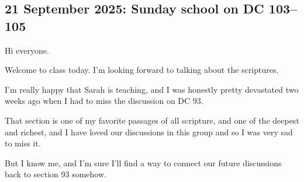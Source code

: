 	\subsection{21 September 2025: Sunday school on DC 103--105}
		\label{TALKS-21-09-2025}
		
		\begin{compactitem}
		
			\item Hi everyone.
				\begin{compactitem}
					\item Welcome to class today. I'm looking forward to talking about the scriptures.
					\item I'm really happy that Sarah is teaching, and I was honestly pretty devastated two weeks ago when I had to miss the discussion on DC 93.
					\item That section is one of my favorite passages of all scripture, and one of the deepest and richest, and I have loved our discussions in this group and so I was very sad to miss it.
					\item But I know me, and I'm sure I'll find a way to connect our future discussions back to section 93 somehow.
				\end{compactitem}
				

\end{compactitem}

